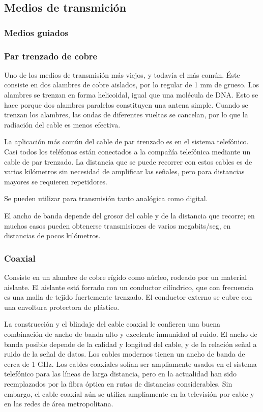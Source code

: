  \subsection{Medios de transmición}
 \subsubsection{Medios guiados}
 \subsubsection*{Par trenzado de cobre} Uno de los medios de transmisión más viejos, y todavía el más común. Éste consiste en dos alambres de cobre aislados, por lo regular de 1 mm de grueso. Los alambres se trenzan en forma helicoidal, igual que una molécula de DNA. Esto se hace porque dos alambres paralelos constituyen una antena simple. Cuando se trenzan los alambres, las ondas de diferentes vueltas se cancelan, por lo que la radiación del cable es menos efectiva.

La aplicación más común del cable de par trenzado es en el sistema telefónico. Casi todos los teléfonos están conectados a la compañía telefónica mediante un cable de par trenzado. La distancia que se puede recorrer con estos cables es de varios kilómetros sin necesidad de amplificar las señales, pero para distancias mayores se requieren repetidores.
    
Se pueden utilizar para transmisión tanto analógica como digital. 

El ancho de banda depende del grosor del cable y de la distancia que recorre; en muchos casos pueden obtenerse transmisiones de varios megabits/seg, en distancias de pocos kilómetros.

\subsubsection*{Coaxial}
Consiste en un alambre de cobre rígido como núcleo, rodeado por un material aislante. El aislante está forrado con un conductor cilíndrico, que con frecuencia es una malla de tejido fuertemente trenzado. El conductor externo se cubre con una envoltura protectora de plástico.

La construcción y el blindaje del cable coaxial le confieren una buena combinación de ancho de banda alto y excelente inmunidad al ruido. El ancho de banda posible depende de la calidad y longitud del cable, y de la relación señal a ruido de la señal de datos. Los cables modernos tienen un ancho de banda de cerca de 1 GHz. Los cables coaxiales solían ser ampliamente usados en el sistema telefónico para las líneas de larga distancia, pero en la actualidad han sido reemplazados
por la fibra óptica en rutas de distancias considerables. Sin embargo, el cable coaxial aún se utiliza ampliamente en la televisión por cable y en las redes de área metropolitana.

